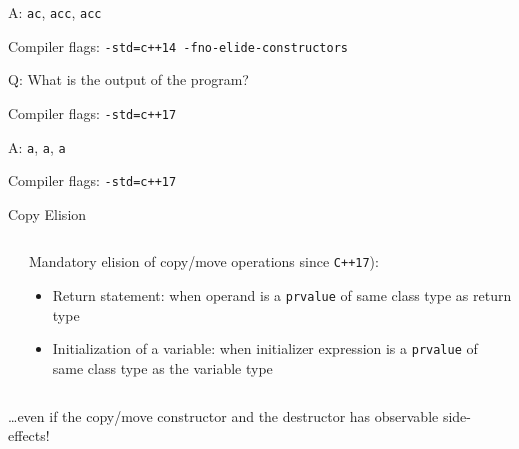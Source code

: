 \addtocounter{framenumber}{-1}
\begin{frame}[fragile]{A: \texttt{ac}, \texttt{acc}, \texttt{acc}}
    \begin{center}
        Compiler flags: \texttt{-std=c++14 -fno-elide-constructors}
    \end{center}

\end{frame}

\begin{frame}[fragile]{Q: What is the output of the program?}
    \begin{center}
        Compiler flags: \texttt{-std=c++17}
    \end{center}

\end{frame}

\addtocounter{framenumber}{-1}
\begin{frame}[fragile]{A: \texttt{a}, \texttt{a}, \texttt{a}}
    \begin{center}
        Compiler flags: \texttt{-std=c++17}
    \end{center}

\end{frame}

\begin{frame}
    \centering

\end{frame}

\begin{frame}{Copy Elision}
    \begin{columns}
        \begin{column}{.45\textwidth}
        \end{column}
        \begin{column}{.5\textwidth}
            Mandatory elision of copy/move operations since \texttt{C++17}):
            \begin{itemize}
                \item Return statement: when operand is a \texttt{prvalue} of same class type as return type
                \item Initialization of a variable: when initializer expression is a \texttt{prvalue} of same class type as the variable type
            \end{itemize}
        \end{column}
    \end{columns}
    \ldots even if the copy/move constructor and the destructor has observable side-effects!
    \vspace{.5cm}

    \centering
\end{frame}

